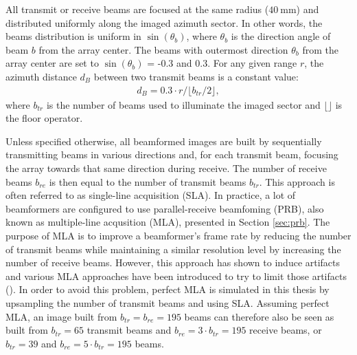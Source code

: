 All transmit or receive beams are focused at the same radius ($40~$mm) and distributed uniformly along the imaged azimuth sector. In other words, the beams distribution is uniform in $\sin(\theta_b)$, where $\theta_b$ is the direction angle of beam $b$ from the array center.
The beams with outermost direction $\theta_b$ from the array center are set to $\sin(\theta_b)$ = -0.3 and 0.3.
For any given range $r$, the azimuth distance $d_B$ between two transmit beams is a constant value:
\begin{align}
    d_B = 0.3 \cdot r / \lfloor b_{tr} / 2 \rfloor,
\label{eq:dist_beams}
\end{align}
\noindent
where $b_{tr}$ is the number of beams used to illuminate the imaged sector and $\lfloor \rfloor$ is the floor operator.

Unless specified otherwise, all beamformed images are built by sequentially transmitting beams in various directions and, for each transmit beam, focusing the array towards that same direction during receive. The number of receive beams $b_{re}$ is then equal to the number of transmit beams $b_{tr}$. This approach is often referred to as single-line acquisition (SLA).
In practice, a lot of beamformers are configured to use parallel-receive beamfoming (PRB), also known as multiple-line acqusition (MLA), presented in Section \ref{sec:prb}. The purpose of MLA is to improve a beamformer's frame rate by reducing the number of transmit beams while maintaining a similar resolution level by increasing the number of receive beams.
However, this approach has shown to induce artifacts and various MLA approaches have been introduced to try to limit those artifacts (\cite{multiline}).
In order to avoid this problem, perfect MLA is simulated in this thesis by upsampling the number of transmit beams and using SLA. Assuming perfect MLA, an image built from $b_{tr} = b_{re} = 195$ beams can therefore also be seen as built from $b_{tr} = 65$ transmit beams and $b_{re} = 3 \cdot b_{tr} = 195$ receive beams, or $b_{tr} = 39$ and $b_{re} = 5 \cdot b_{tr} = 195$ beams.

